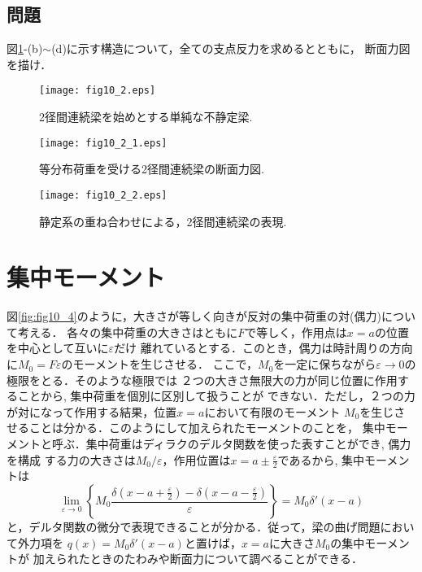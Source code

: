 \documentclass[10pt,a4j]{jarticle}
\begin{document}
\subsection{問題}
図\ref{fig:fig10_2}-(b)$\sim$(d)に示す構造について，全ての支点反力を求めるとともに，
断面力図を描け．
\begin{figure}[h]
	\begin{center}
	\texttt{[image: fig10\_2.eps]} 
	\end{center}
	\caption{
		2径間連続梁を始めとする単純な不静定梁.
	} 
	\label{fig:fig10_2}
\end{figure}
\begin{figure}[h]
	\begin{center}
	\texttt{[image: fig10\_2\_1.eps]} 
	\end{center}
	\caption{
		等分布荷重を受ける2径間連続梁の断面力図.
	} 
	\label{fig:fig10_2_1}
\end{figure}
\begin{figure}[h]
	\begin{center}
	\texttt{[image: fig10\_2\_2.eps]} 
	\end{center}
	\caption{
		静定系の重ね合わせによる，2径間連続梁の表現.
	} 
	\label{fig:fig10_2_2}
\end{figure}
\section{集中モーメント}
図\ref{fig:fig10_4}のように，大きさが等しく向きが反対の集中荷重の対(偶力)について考える．
各々の集中荷重の大きさはともに$F$で等しく，作用点は$x=a$の位置を中心として互いに$\varepsilon$だけ
離れているとする．このとき，偶力は時計周りの方向に$M_0=F\varepsilon$のモーメントを生じさせる．
ここで，$M_0$を一定に保ちながら$\varepsilon \rightarrow 0$の極限をとる．そのような極限では
２つの大きさ無限大の力が同じ位置に作用することから, 集中荷重を個別に区別して扱うことが
できない．ただし，２つの力が対になって作用する結果，位置$x=a$において有限のモーメント
$M_0$を生じさせることは分かる．このようにして加えられたモーメントのことを，
集中モーメントと呼ぶ．集中荷重はディラクのデルタ関数を使った表すことができ, 偶力を構成
する力の大きさは$M_0/\varepsilon$，作用位置は$x=a\pm\frac{\varepsilon}{2}$であるから,
集中モーメントは
\begin{equation}
	\lim_{\varepsilon \rightarrow 0} 
	\left\{
	M_0\frac{
		\delta\left(x-a+\frac{\varepsilon}{2}\right)
		-
		\delta\left(x-a-\frac{\varepsilon}{2}\right)
	}{\varepsilon}
	\right\}
	=M_0 \delta '\left( x-a \right)
\end{equation}
と，デルタ関数の微分で表現できることが分かる．従って，梁の曲げ問題において外力項を
$q(x)=M_0\delta'\left(x-a\right)$と置けば，$x=a$に大きさ$M_0$の集中モーメントが
加えられたときのたわみや断面力について調べることができる．
\end{document}
